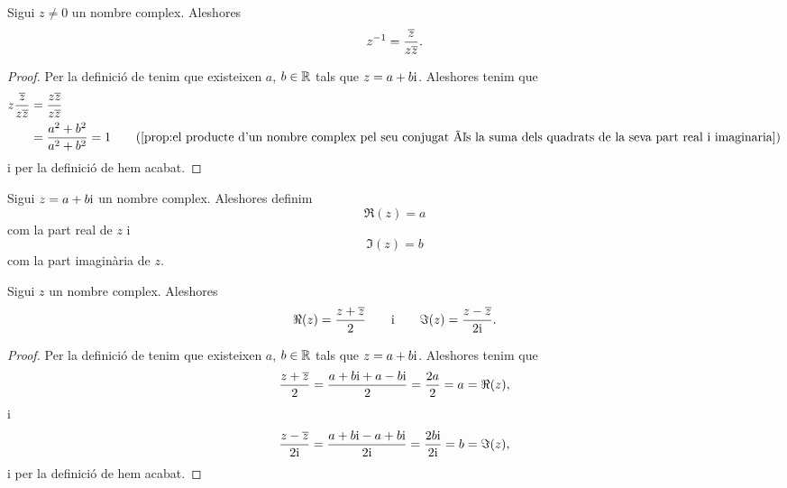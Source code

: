 \documentclass[../../Main.tex]{subfiles}
\begin{document}
	\begin{proposition}
		\label{prop:inversa d'un nombre complex en funció del seu conjugat}
		Sigui \(z\neq0\) un nombre complex.
        Aleshores
		\[
            z^{-1} = \frac{\overline{z}}{z\overline{z}}.
        \]
		\begin{proof}
			Per la definició de  tenim que existeixen \(a\), \(b\in\mathbb{R}\) tals que \(z = a+b\mathrm{i}\).
            Aleshores tenim que
			\begin{align*}
				z\frac{\conjugat{z}}{z\conjugat{z}} &= \frac{z\conjugat{z}}{z\conjugat{z}} \\
				 &= \frac{a^{2}+b^{2}}{a^{2}+b^{2}} = 1 \tag{\ref{prop:el producte d'un nombre complex pel seu conjugat és la suma dels quadrats de la seva part real i imaginaria}}
			\end{align*}
			i per la definició de  hem acabat.
		\end{proof}
	\end{proposition}
	\begin{definition}
		\label{def:part real i part imaginària d'un nombre complex}
		\label{def:part real d'un nombre complex}
		\label{def:part imaginària d'un nombre complex}
		Sigui \(z = a+b\mathrm{i}\) un nombre complex.
        Aleshores definim
		\[
            \Re(z) = a
        \]
		com la part real de \(z\) i
		\[
            \Im(z) = b
        \]
		com la part imaginària de \(z\).
	\end{definition}
	\begin{proposition}
		\label{prop:fórmules per la part real i part imaginària d'un nombre complex}
		\label{prop:fórmula per la part real d'un nombre complex}
		\label{prop:fórmula per la part imaginària d'un nombre complex}
		Sigui \(z\) un nombre complex.
        Aleshores
		\[
            \Re(z) = \frac{z+\overline{z}}{2}\qquad\text{i}\qquad\Im(z) = \frac{z-\overline{z}}{2\mathrm{i}}.
        \]
		\begin{proof}
			Per la definició de  tenim que existeixen \(a\), \(b\in\mathbb{R}\) tals que \(z = a+b\mathrm{i}\).
            Aleshores tenim que
			\[
                \frac{z+\overline{z}}{2} = \frac{a+b\mathrm{i}+a-b\mathrm{i}}{2} = \frac{2a}{2} = a = \Re(z),
            \]
			i
			\[
                \frac{z-\overline{z}}{2\mathrm{i}} = \frac{a+b\mathrm{i}-a+b\mathrm{i}}{2\mathrm{i}} = \frac{2b\mathrm{i}}{2\mathrm{i}} = b = \Im(z),
            \]
			i per la definició de  hem acabat.
		\end{proof}
	\end{proposition}
\end{document}
